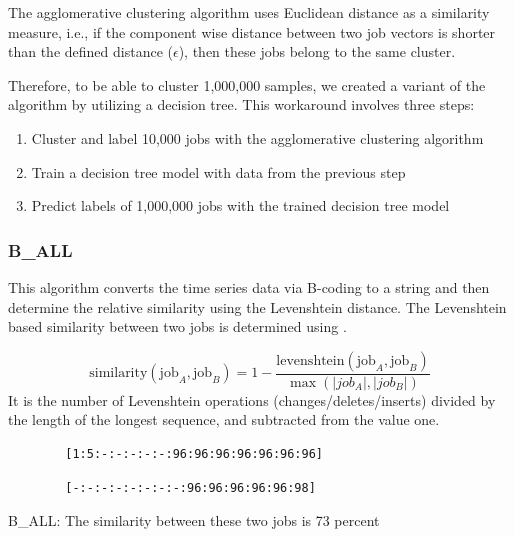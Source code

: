 \documentclass{jhps}
\begin{document}
The agglomerative clustering algorithm uses Euclidean distance as a similarity measure, i.e., if the component wise distance between two job vectors is shorter than the defined distance ($\epsilon$), then these jobs belong to the same cluster.

Therefore, to be able to cluster 1,000,000 samples, we created a variant of the algorithm by utilizing a decision tree.
This workaround involves three steps:

\begin{enumerate}
 \item Cluster and label 10,000 jobs with the agglomerative clustering algorithm
 \item Train a decision tree model with data from the previous step
 \item Predict labels of 1,000,000 jobs with the trained decision tree model
\end{enumerate}

\subsubsection{B\_ALL}
This algorithm converts the time series data via B-coding to a string and then determine the relative similarity using the Levenshtein distance.
The Levenshtein based similarity between two jobs is determined using .

\begin{equation}
	\text{similarity}\left(\text{job}_{A},\text{job}_{B} \right) = 1 - \frac{\text{levenshtein}\left(\text{job}_{A},\text{job}_{B} \right) }{\max \left(|job_{A}|,|job_{B}| \right) } \label{eq:sim:bin_all}
\end{equation}
It is the number of Levenshtein operations (changes/deletes/inserts) divided by the length of the longest sequence, and subtracted from the value one.


\begin{listing}
	\noindent\begin{minipage}{0.50\textwidth}
		\begin{lstlisting}
		[1:5:-:-:-:-:-:96:96:96:96:96:96:96]
		\end{lstlisting}
		\vspace{-2em}
		\label{lst:test:a}
	\end{minipage}
	\hfill
	\noindent\begin{minipage}{0.50\textwidth}
		\begin{lstlisting}
		[-:-:-:-:-:-:-:-:96:96:96:96:96:98]
		\end{lstlisting}
		\vspace{-2em}
		\label{lst:test:b}
	\end{minipage}
	\caption{B\_ALL: The similarity between these two jobs is 73 percent}
	\label{lst:test}
\end{listing}
\end{document}
